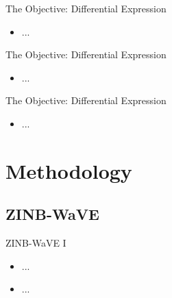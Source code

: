 \documentclass{beamer}
\begin{document}
\begin{frame}{The Objective: Differential Expression}

\begin{itemize}
  \itemsep10pt
  \item ...
\end{itemize}

\end{frame}


\begin{frame}{The Objective: Differential Expression}

\begin{itemize}
  \itemsep10pt
  \item ...
\end{itemize}

\end{frame}


\begin{frame}{The Objective: Differential Expression}

\begin{itemize}
  \itemsep10pt
  \item ...
\end{itemize}

\end{frame}

\section{Methodology}
\subsection{ZINB-WaVE}

\begin{frame}{ZINB-WaVE I}

\begin{itemize}
  \itemsep10pt
  \item ...
  \item ...
\end{itemize}

\end{frame}
\end{document}
